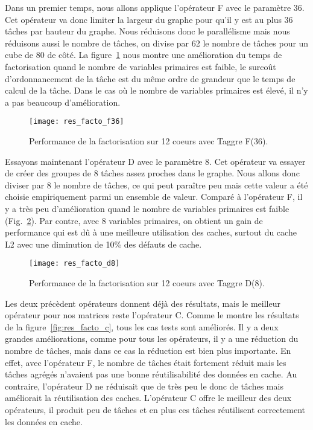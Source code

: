Dans un premier temps, nous allons applique l'opérateur F avec le paramètre 36.
%
Cet opérateur va donc limiter la largeur du graphe pour qu'il y est au plus 36 tâches par hauteur du graphe.
%
Nous réduisons donc le parallélisme mais nous réduisons aussi le nombre de tâches, on divise par 62 le nombre de tâches pour un cube de 80 de côté.
%
La figure~\ref{fig:res_facto_f36} nous montre une amélioration du temps de factorisation quand le nombre de variables primaires est faible, le surcoût d'ordonnancement de la tâche est du même ordre de grandeur que le temps de calcul de la tâche.
%
Dans le cas où le nombre de variables primaires est élevé, il n'y a pas beaucoup d'amélioration.


\begin{figure}[t!]
  \centering
  \texttt{[image: res\_facto\_f36]}
  \caption{Performance de la factorisation sur 12 coeurs avec Taggre F(36).}
  \label{fig:res_facto_f36}
\end{figure}

Essayons maintenant l'opérateur D avec le paramètre 8.
%
Cet opérateur va essayer de créer des groupes de 8 tâches assez proches dans le graphe.
%
Nous allons donc diviser par 8 le nombre de tâches, ce qui peut paraître peu mais cette valeur a été choisie empiriquement parmi un ensemble de valeur.
%
Comparé à l'opérateur F, il y a très peu d'amélioration quand le nombre de variables primaires est faible (Fig.~\ref{fig:res_facto_d8}).
%
Par contre, avec 8 variables primaires, on obtient un gain de performance qui est dû à une meilleure utilisation des caches, surtout du cache L2 avec une diminution de 10\% des défauts de cache.

\begin{figure}[t!]
  \centering
  \texttt{[image: res\_facto\_d8]}
  \caption{Performance de la factorisation sur 12 coeurs avec Taggre D(8).}
  \label{fig:res_facto_d8}
\end{figure}

Les deux précèdent opérateurs donnent déjà des résultats, mais le meilleur opérateur pour nos matrices reste l'opérateur C.
%
Comme le montre les résultats de la figure~\ref{fig:res_facto_c}, tous les cas tests sont améliorés.
%
Il y a deux grandes améliorations, comme pour tous les opérateurs, il y a une réduction du nombre de tâches, mais dans ce cas la réduction est bien plus importante.
%
En effet, avec l'opérateur F, le nombre de tâches était fortement réduit mais les tâches agrégés n'avaient pas une bonne réutilisabilité des données en cache.
%
Au contraire, l'opérateur D ne réduisait que de très peu le donc de tâches mais améliorait la réutilisation des caches.
%
L'opérateur C offre le meilleur des deux opérateurs, il produit peu de tâches et en plus ces tâches réutilisent correctement les données en cache.


